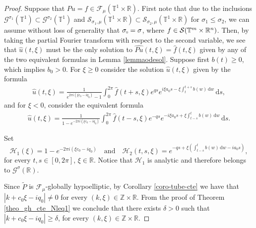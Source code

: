 \documentclass[10pt,a4paper]{amsart}
\newcommand{\G}{\mathnormal{\mathbb{T}^{m}\times\mathbb{R}^n}}
\newcommand{\R}{\mathbb{R}}
\newcommand{\Smu}{\mathscr{F}_{\mu}(\T^1\times\R)}
\newcommand{\T}{\mathbb{T}}
\newcommand{\Z}{\mathbb{Z}}
\newcommand{\g}{\mathbb{T}^1\times\mathbb{R}}
\newcommand{\s}{\mathcal{S}(\G)}
\newcommand{\sigmac}{\sigma_{\scalebox{0.5}{$0$}}}
\begin{document}
\begin{proof}
    Suppose that $Pu=f\in\Smu$. First note that due to the inclusions $\mathscr{G}^{\sigma_1}(\T^1)\subset \mathscr{G}^{\sigma_2}(\T^1)$ and $\mathcal{S}_{\sigma_1,\mu}(\g)\subset\mathcal{S}_{\sigma_2,\mu}(\g)$ for $\sigma_1\leq \sigma_2$, we can assume without loss of generality that $\sigmac=\sigma$, where  $f\in\s$. Then, by taking the partial Fourier transform with respect to the second variable, we see that $\widehat{u}(t,\xi)$ must be the only solution to $\widehat{Pu}(t,\xi) = \widehat{f}(t,\xi)$ given by any of the two equivalent formulas in Lemma \ref{lemmaodesol}. Suppose first $b(t)\geq 0$, which implies $ b_0>0$. For $\xi\geq 0$ consider the solution $\widehat{u}(t,\xi)$ given by the formula
    \begin{align*}
        \widehat{u}(t,\xi)=\frac{1}{e^{2\pi i(\xi c_0-iq_0)}-1}\int_{0}^{2\pi}\widehat{f}(t+s,\xi)e^{qs}e^{i\xi a_0s-\xi\int_{t}^{t+s}b(w)\,\mathrm{d}w}\,\mathrm{d}s,
    \end{align*}
    and for $\xi<0$, consider the equivalent formula
        \begin{align*}
        \widehat{u}(t,\xi)=\frac{1}{1-e^{-2\pi i(\xi c_0-iq_0)}}\int_{0}^{2\pi}\widehat{f}(t-s,\xi)e^{-qs}e^{-i\xi a_0s+\xi\int_{t-s}^{t}b(w)\,\mathrm{d}w}\,\mathrm{d}s.
    \end{align*}

    Set 
    \begin{equation*}
        \mathcal{H}_1(\xi)=1-e^{-2\pi i (\xi c_0-i q_0)}\quad\text{and}\quad 
         \mathcal{H}_2(t,s,\xi)=e^{-qs+\xi\left(\int_{t-s}^t b(w)\,\mathrm{d}w-ia_0s\right)},
    \end{equation*}
    for every $t,s\in [0,2\pi]$, $\xi\in\R$.
    Notice that $\mathcal{H}_1$ is analytic and therefore belongs to $\mathscr{G}^\sigma(\R)$.

    Since $\tilde P$ is $\mathscr{F}_{\mu}$-globally hypoelliptic, by Corollary \ref{coro-tube-cte} we have that $|k+c_0\xi-iq_0|\neq 0$ for every $(k,\xi)\in\Z\times \R$. From the proof of Theorem \ref{theo_gh_cte_Nleq1} we conclude that there exists $\delta>0$ such that 
    $|k+c_0\xi-iq_0|\geq \delta$, for every $(k,\xi)\in\Z\times \R$.


\end{proof}
\end{document}

